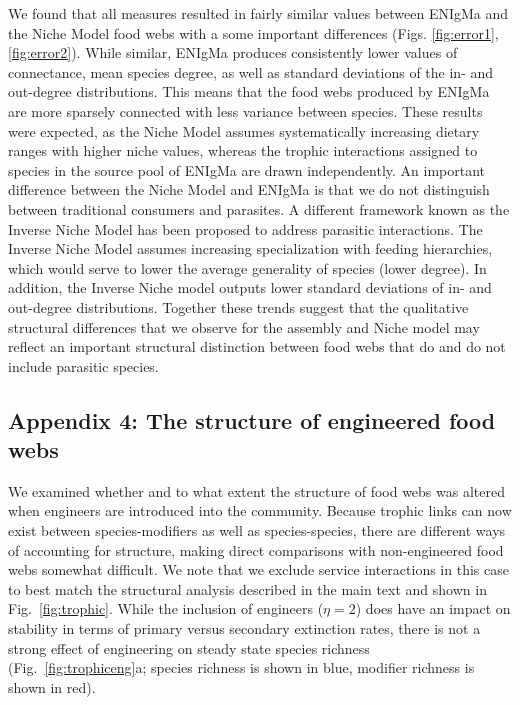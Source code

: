\documentclass[twocolumn,preprintnumbers,amsmath,amssymb,superscriptaddress,linenumbers]{revtex4-1}
\begin{document}
We found that all measures resulted in fairly similar values between ENIgMa and the Niche Model food webs with a some important differences (Figs. \ref{fig:error1},\ref{fig:error2}).
While similar, ENIgMa produces consistently lower values of connectance, mean species degree, as well as standard deviations of the in- and out-degree distributions.
This means that the food webs produced by ENIgMa are more sparsely connected with less variance between species.
These results were expected, as the Niche Model assumes systematically increasing dietary ranges with higher niche values, whereas the trophic interactions assigned to species in the source pool of ENIgMa are drawn independently.
An important difference between the Niche Model and ENIgMa is that we do not distinguish between traditional consumers and parasites.
A different framework known as the Inverse Niche Model \cite{Warren2010} has been proposed to address parasitic interactions.
The Inverse Niche Model assumes increasing specialization with feeding hierarchies, which would serve to lower the average generality of species (lower degree).
In addition, the Inverse Niche model outputs lower standard deviations of in- and out-degree distributions.
Together these trends suggest that the qualitative structural differences that we observe for the assembly and Niche model may reflect an important structural distinction between food webs that do and do not include parasitic species.

\subsection*{Appendix 4: The structure of engineered food webs}
We examined whether and to what extent the structure of food webs was altered when engineers are introduced into the community.
Because trophic links can now exist between species-modifiers as well as species-species, there are different ways of accounting for structure, making direct comparisons with non-engineered food webs somewhat difficult.
We note that we exclude service interactions in this case to best match the structural analysis described in the main text and shown in Fig.\ \ref{fig:trophic}.
While the inclusion of engineers ($\eta = 2$) does have an impact on stability in terms of primary versus secondary extinction rates, there is not a strong effect of engineering on steady state species richness (Fig.\ \ref{fig:trophiceng}a; species richness is shown in blue, modifier richness is shown in red).
\end{document}
